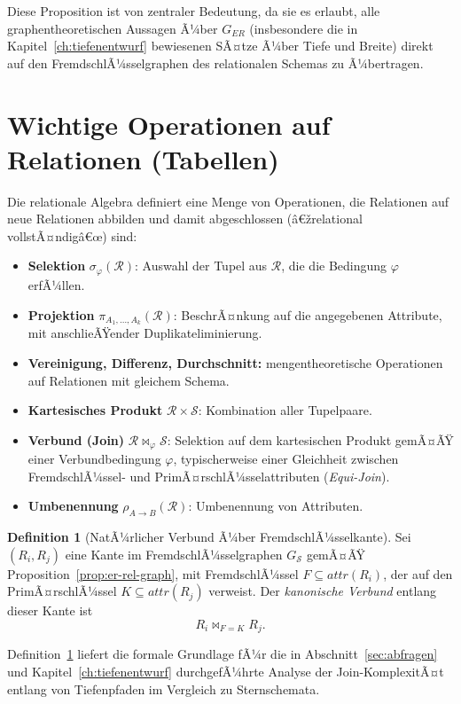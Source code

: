 ﻿\documentclass[a4paper,12pt]{report}
\theoremstyle{definition}
\newtheorem{definition}{Definition}[chapter]
\theoremstyle{remark}
\newcommand{\R}{\mathcal{R}}
\newcommand{\att}{\mathit{attr}}
\begin{document}
Diese Proposition ist von zentraler Bedeutung, da sie es erlaubt, alle
graphentheoretischen Aussagen Ã¼ber $G_{ER}$ (insbesondere die in
Kapitel~\ref{ch:tiefenentwurf} bewiesenen SÃ¤tze Ã¼ber Tiefe und Breite)
direkt auf den FremdschlÃ¼sselgraphen des relationalen Schemas zu
Ã¼bertragen.

\section{Wichtige Operationen auf Relationen (Tabellen)}
\label{sec:relalg}

Die relationale Algebra definiert eine Menge von Operationen, die
Relationen auf neue Relationen abbilden und damit abgeschlossen
(â€žrelational vollstÃ¤ndigâ€œ) sind:

\begin{itemize}
  \item \textbf{Selektion} $\sigma_{\varphi}(\R)$: Auswahl der Tupel aus
    $\R$, die die Bedingung $\varphi$ erfÃ¼llen.
  \item \textbf{Projektion} $\pi_{A_1,\ldots,A_k}(\R)$: BeschrÃ¤nkung auf
    die angegebenen Attribute, mit anschlieÃŸender Duplikateliminierung.
  \item \textbf{Vereinigung, Differenz, Durchschnitt:} mengentheoretische
    Operationen auf Relationen mit gleichem Schema.
  \item \textbf{Kartesisches Produkt} $\R \times \mathcal{S}$: Kombination
    aller Tupelpaare.
  \item \textbf{Verbund (Join)} $\R \Join_{\varphi} \mathcal{S}$: Selektion
    auf dem kartesischen Produkt gemÃ¤ÃŸ einer Verbundbedingung $\varphi$,
    typischerweise einer Gleichheit zwischen FremdschlÃ¼ssel- und
    PrimÃ¤rschlÃ¼sselattributen (\emph{Equi-Join}).
  \item \textbf{Umbenennung} $\rho_{A \to B}(\R)$: Umbenennung von
    Attributen.
\end{itemize}

\begin{definition}[NatÃ¼rlicher Verbund Ã¼ber FremdschlÃ¼sselkante]
\label{def:fk-join}
Sei $(R_i,R_j)$ eine Kante im FremdschlÃ¼sselgraphen $G_{\mathcal{S}}$
gemÃ¤ÃŸ Proposition~\ref{prop:er-rel-graph}, mit FremdschlÃ¼ssel
$F \subseteq \att(R_i)$, der auf den PrimÃ¤rschlÃ¼ssel $K \subseteq
\att(R_j)$ verweist. Der \emph{kanonische Verbund} entlang dieser Kante
ist
\[
  R_i \Join_{F=K} R_j .
\]
\end{definition}

Definition~\ref{def:fk-join} liefert die formale Grundlage fÃ¼r die in
Abschnitt~\ref{sec:abfragen} und Kapitel~\ref{ch:tiefenentwurf}
durchgefÃ¼hrte Analyse der Join-KomplexitÃ¤t entlang von Tiefenpfaden im
Vergleich zu Sternschemata.
\end{document}
